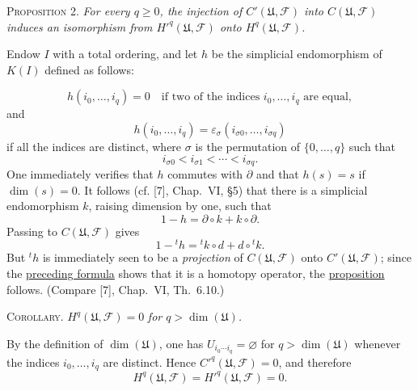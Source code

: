 \label{fac:I:3:no:20:prop:2}
\textsc{Proposition 2.} \textit{For every $q\geq0$, the injection of $C'(\mathfrak{U},\mathcal{F})$ into $C(\mathfrak{U},\mathcal{F})$ induces an isomorphism from $H'^{q}(\mathfrak{U},\mathcal{F})$ onto $H^q(\mathfrak{U},\mathcal{F})$.}

Endow $I$ with a total ordering, and let $h$ be the simplicial endomorphism of $K(I)$ defined as follows:

\[
h(i_0,\ldots,i_q)=0
\quad\text{if two of the indices }i_0,\ldots,i_q\text{ are equal},
\]
and
\[
h(i_0,\ldots,i_q)
=\varepsilon_\sigma(i_{\sigma0},\ldots,i_{\sigma q})
\]
if all the indices are distinct, where $\sigma$ is the permutation of $\{0,\ldots,q\}$ such that
\[
i_{\sigma0}<i_{\sigma1}<\cdots<i_{\sigma q}.
\]
One immediately verifies that $h$ commutes with $\partial$ and that $h(s)=s$ if $\dim(s)=0$. It follows (cf. [7], Chap.~VI, \S5) that there is a simplicial endomorphism $k$, raising dimension by one, such that
\[
1-h=\partial\circ k+k\circ\partial.
\]
Passing to $C(\mathfrak{U},\mathcal{F})$ gives
\label{fac:I:3:no:20:formula:homotopy}
\[
1-{}^{t}h={}^{t}k\circ d+d\circ{}^{t}k.
\]
But ${}^{t}h$ is immediately seen to be a \textit{projection} of $C(\mathfrak{U},\mathcal{F})$ onto $C'(\mathfrak{U},\mathcal{F})$; since the \hyperref[fac:I:3:no:20:formula:homotopy]{preceding formula} shows that it is a homotopy operator, the \hyperref[fac:I:3:no:20:prop:2]{proposition} follows. (Compare [7], Chap.~VI, Th.~6.10.)

\label{fac:I:3:no:20:prop:2:cor}
\textsc{Corollary.} $H^q(\mathfrak{U},\mathcal{F})=0$ \textit{for $q>\dim(\mathfrak{U})$.}

By the definition of $\dim(\mathfrak{U})$, one has $U_{i_0\cdots i_q}=\varnothing$ for $q>\dim(\mathfrak{U})$ whenever the indices $i_0,\ldots,i_q$ are distinct. Hence $C'^{q}(\mathfrak{U},\mathcal{F})=0$, and therefore
\[
H^q(\mathfrak{U},\mathcal{F})=H'^{q}(\mathfrak{U},\mathcal{F})=0.
\]

